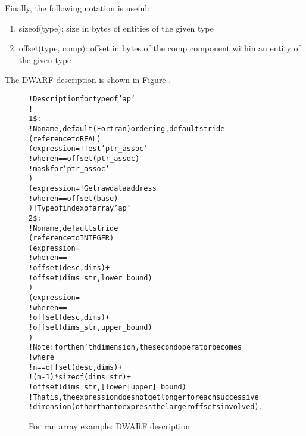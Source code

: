 Finally, the following notation is useful:
\begin{enumerate}[1. ]
\item  sizeof(type): size in bytes of entities of the given type
\item offset(type, comp): offset in bytes of the comp component
within an entity of the given type
\end{enumerate}

The DWARF description is shown 
in Figure .

\begin{figure}[ht]
\begin{dwflisting}
\begin{alltt}
! Description for type of 'ap'
!
1\$: \DWTAGarraytype
        ! No name, default (Fortran) ordering, default stride
        \DWATtype(reference to REAL)
        \DWATassociated(expression=    ! Test 'ptr\_assoc' 
            \DWOPpushobjectaddress
            \DWOPlitn                ! where n == offset(ptr\_assoc)
            \DWOPplus
            \DWOPderef
            \DWOPlitone                  ! mask for 'ptr\_assoc' 
            \DWOPand)
        \DWATdatalocation(expression= ! Get raw data address
            \DWOPpushobjectaddress
            \DWOPlitn                ! where n == offset(base)
            \DWOPplus
            \DWOPderef)                ! Type of index of array 'ap'
2\$:     \DWTAGsubrangetype
            ! No name, default stride
            \DWATtype(reference to INTEGER)
            \DWATlowerbound(expression=
                \DWOPpushobjectaddress
                \DWOPlitn             ! where n ==
                                         !   offset(desc, dims) +
                                         !   offset(dims\_str, lower\_bound)
                \DWOPplus
                \DWOPderef)
            \DWATupperbound(expression=
                \DWOPpushobjectaddress
                \DWOPlitn            ! where n ==
                                        !   offset(desc, dims) +
                                        !   offset(dims\_str, upper\_bound)
                \DWOPplus
                \DWOPderef)
            !  Note: for the m'th dimension, the second operator becomes
            !  \DWOPlitn where
            !       n == offset(desc, dims)          +
            !                (m-1)*sizeof(dims\_str)  +
            !                 offset(dims\_str, [lower|upper]\_bound)
            !  That is, the expression does not get longer for each successive 
            !  dimension (other than to express the larger offsets involved).
\end{alltt}
\end{dwflisting}
\caption{Fortran array example: DWARF description}
\label{fig:fortranarrayexampledwarfdescription}
\end{figure}

